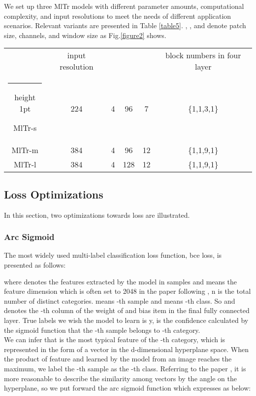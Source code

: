 \documentclass{article} \usepackage[numbers,sort&compress]{natbib}
\makeatletter
\newcommand{\thickhline}{\noalign {\ifnum 0=`}\fi \hrule height 1pt
    \futurelet \reserved@a \@xhline
}
\makeatother
\begin{document}
We set up three MlTr models with different parameter amounts, computational complexity, and input resolutions to meet the needs of different application scenarios. Relevant variants are presented in Table \textcolor{red}{\ref{table5}}. , , and  denote patch size, channels, and window size as Fig.\textcolor{red}{\ref{figure2}} shows. 

\begin{table*}[h]
\centering
\caption{Architecture Variants of MlTr.}
\label{table5}
\begin{tabular}{|c|c|c|c|c|c|}
\hline
\  & input resolution &  &  &  &block numbers in four layer \\
\thickhline
MlTr-s &224 &4 &96 &7 &\{1,1,3,1\}  \\
\hline
MlTr-m &384 &4 &96  &12  &\{1,1,9,1\}  \\
\hline
MlTr-l &384 &4 &128  &12  &\{1,1,9,1\}  \\
\hline
\end{tabular}
\end{table*}

\subsection{Loss Optimizations}
\label{loss}
In this section, two optimizations towards loss are illustrated. 
\subsubsection{Arc Sigmoid}
The most widely used multi-label classification loss function, bce loss, is presented as follows:

where  denotes the features extracted by the model in  samples and  means the feature dimension which is often set to 2048 in the paper following \cite{he2016deep}, n is the total number of distinct categories.  means -th sample and  means -th class. So  and  denotes the -th column of the weight of 
and bias item in the final fully connected layer. True labels we wish the model to learn is y,  is the confidence calculated by the sigmoid function that the -th sample belongs to -th category.\\
We can infer that  is the most typical feature of the -th category, which is represented in the form of a vector in the d-dimensional hyperplane space. When the product of feature  and  learned by the model from an image reaches the maximum, we label the -th sample as the -th class. Referring to the paper \cite{deng2019arcface,liu2017sphereface,liu2016large}, it is more reasonable to describe the similarity among vectors by the angle on the hyperplane, so we put forward the arc sigmoid function which expresses as below:
\end{document}
